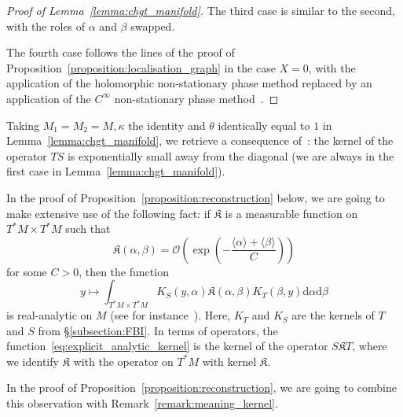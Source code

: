 \documentclass[AHL,Unicode,longabstracts,published]{cedram}
\newcommand{\p}[1]{\left(#1\right)}
\newcommand{\brac}[1]{\langle #1 \rangle}
\newcommand{\clO}{\mathcal{O}}
\newcommand{\fkK}{\mathfrak{K}}
\newcommand{\rmd}{\mathrm{d}}
\newcommand{\clO}{\mathcal{O}}
\begin{document}
\begin{proof}[Proof of Lemma~\ref{lemma:chgt_manifold}]
The third case is similar to the second, with the roles of $\alpha$ and $\beta$ swapped.

The fourth case follows the lines of the proof of Proposition~\ref{proposition:localisation_graph} in the case $X = 0$, with the application of the holomorphic non-stationary phase method replaced by an application of the $C^\infty$ non-stationary phase method~\cite[Theorem~7.7.1]{hormander_book_1}.
\end{proof}

\begin{rema}\label{remark:TS_away_diagonal}
Taking $M_1 = M_2 = M, \kappa$ the identity and $\theta$ identically equal to $1$ in Lemma~\ref{lemma:chgt_manifold}, we retrieve a consequence of~\cite[Lemma~2.9]{BJ20}: the kernel of the operator $TS$ is exponentially small away from the diagonal (we are always in the first case in Lemma~\ref{lemma:chgt_manifold}).
\end{rema}

\begin{rema}\label{remark:small_to_analytic}
In the proof of Proposition~\ref{proposition:reconstruction} below, we are going to make extensive use of the following fact: if $\fkK$ is a measurable function on $T^* M \times T^*M$ such that
\begin{equation}\label{eq:meaning_exponentially_small}
\fkK(\alpha,\beta) = \clO\p{\exp\p{- \frac{\brac{\alpha} + \brac{\beta}}{C}}}
\end{equation}
for some $C > 0$, then the function
\begin{equation}\label{eq:explicit_analytic_kernel}
y \mapsto \int_{T^* M \times T^* M} K_S(y,\alpha) \fkK(\alpha,\beta) K_T(\beta,y) \rmd \alpha \rmd \beta
\end{equation}
is real-analytic on $M$ (see for instance~\cite[Lemmas~2.5 and 2.6]{BJ20}). Here, $K_T$ and $K_S$ are the kernels of $T$ and $S$ from \S \ref{subsection:FBI}. In terms of operators, the function~\eqref{eq:explicit_analytic_kernel} is the kernel of the operator $S \fkK T$, where we identify $\fkK$ with the operator on $T^* M$ with kernel $\fkK$.

In the proof of Proposition~\ref{proposition:reconstruction}, we are going to combine this observation with Remark~\ref{remark:meaning_kernel}.
\end{rema}
\end{document}
